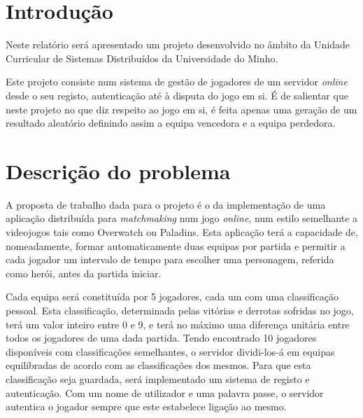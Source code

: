 \documentclass[a4paper]{article}
\begin{document}



\tableofcontents

\pagebreak
\section{Introdução}
\label{sec:1}

\hspace{3mm} Neste relatório será apresentado um projeto desenvolvido no âmbito da Unidade Curricular de Sistemas Distribuídos da Universidade do Minho.

\par Este projeto consiste num sistema de gestão de jogadores de um servidor \emph{online} desde o seu registo, autenticação até à disputa do jogo em si. É de salientar que neste projeto no que diz respeito ao jogo em si, é feita apenas uma geração de um resultado aleatório definindo assim a equipa vencedora e a equipa perdedora.




\section{Descrição do problema}
\label{sec:2}

\hspace{3mm} A proposta de trabalho dada para o projeto é o da implementação de uma aplicação distribuída para \textit{matchmaking} num jogo \textit{online}, num estilo semelhante a videojogos tais como Overwatch ou Paladins. Esta aplicação terá a capacidade de, nomeadamente, formar automaticamente duas equipas por partida e permitir a cada jogador um intervalo de tempo para escolher uma personagem, referida como herói, antes da partida iniciar.

\par Cada equipa será constituída por 5 jogadores, cada um com uma classificação pessoal. Esta classificação, determinada pelas vitórias e derrotas sofridas no jogo, terá um valor inteiro entre 0 e 9, e terá no máximo uma diferença unitária entre todos os jogadores de uma dada partida. Tendo encontrado 10 jogadores disponíveis com classificações semelhantes, o servidor dividi-los-á em equipas equilibradas de acordo com as classificações dos mesmos. Para que esta classificação seja guardada, será implementado um sistema de registo e autenticação. Com um nome de utilizador e uma palavra passe, o servidor autentica o jogador sempre que este estabelece ligação ao mesmo.
\end{document}
